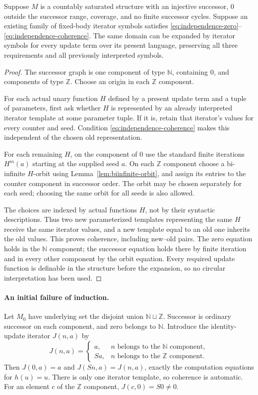 \begin{lemma}
\label{lem:coherent-iterator-extension}
Suppose $M$ is a countably saturated structure with an injective
successor, $0$ outside the successor range, coverage, and no finite
successor cycles.  Suppose an existing family of fixed-body iterator
symbols satisfies \eqref{eq:independence-zero}--\eqref{eq:independence-coherence}.
The same domain can be expanded by iterator symbols for every update
term over its present language, preserving all three requirements and
all previously interpreted symbols.
\end{lemma}
\begin{proof}
The successor graph is one component of type $\mathbb N$, containing
$0$, and components of type $\mathbb Z$.  Choose an origin in each
$\mathbb Z$ component.

For each actual unary function $H$ defined by a present update term
and a tuple of parameters, first ask whether $H$ is represented by an
already interpreted iterator template at some parameter tuple.  If it
is, retain that iterator's values for every counter and seed.  Condition
\eqref{eq:independence-coherence} makes this independent of the chosen
old representation.

For each remaining $H$, on the component of $0$ use the standard
finite iterations $H^m(a)$ starting at the supplied seed $a$.  On
each $\mathbb Z$ component choose a bi-infinite $H$-orbit using
Lemma~\ref{lem:biinfinite-orbit}, and assign its entries to the counter
component in successor order.  The orbit may be chosen separately
for each seed; choosing the same orbit for all seeds is also allowed.

The choices are indexed by actual functions $H$, not by their
syntactic descriptions.  Thus two new parameterized templates
representing the same $H$ receive the same iterator values, and a
new template equal to an old one inherits the old values.  This
proves coherence, including new--old pairs.  The zero equation holds
in the $\mathbb N$ component; the successor equation holds there by
finite iteration and in every other component by the orbit equation.
Every required update function is definable in the structure before
the expansion, so no circular interpretation has been used.
\end{proof}

\paragraph{An initial failure of induction.}
Let $M_0$ have underlying set the disjoint union
$\mathbb N\sqcup\mathbb Z$.  Successor is ordinary successor on
each component, and zero belongs to $\mathbb N$.  Introduce the
identity-update iterator $J(n,a)$ by
\[
 J(n,a)=\begin{cases}
 a,&n\text{ belongs to the }\mathbb N\text{ component},\\
 Sa,&n\text{ belongs to the }\mathbb Z\text{ component}.
 \end{cases}
\]
Then $J(0,a)=a$ and $J(Sn,a)=J(n,a)$, exactly the computation
equations for $h(u)=u$.  There is only one iterator template, so
coherence is automatic.  For an element $c$ of the $\mathbb Z$
component, $J(c,0)=S0\ne0$.

